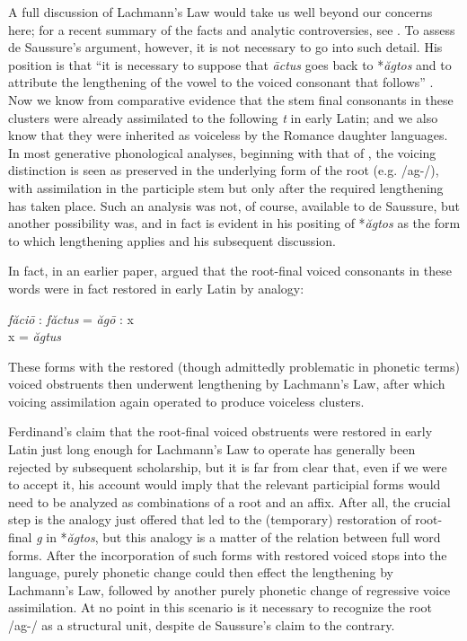 \documentclass[output=paper]{langsci/langscibook}
\begin{document}
A full discussion of Lachmann's Law would take us well beyond our
concerns here; for a recent summary of the facts and analytic
controversies, see \citet{roberts09:lachmann}. To assess de
Saussure's argument, however, it is not necessary to go into such
detail. His position is that ``it is necessary to suppose that
\emph{\=actus} goes back to *\emph{\u{a}gtos} and to attribute the
lengthening of the vowel to the voiced consonant that follows''
.  Now we know
from comparative evidence that the stem final consonants in these
clusters were already assimilated to the following \emph{t} in early
Latin; and we also know that they were inherited as voiceless by the
Romance daughter languages. In most generative phonological analyses,
beginning with that of \citet{kiparsky:thesis}, the voicing
distinction is seen as preserved in the underlying form of the root
(e.g. \mbox{/ag-/}), with assimilation in the participle stem but only
after the required lengthening has taken place. Such an analysis was
not, of course, available to de Saussure, but another possibility was,
and in fact is evident in his positing of *\emph{\u{a}gtos} as the
form to which lengthening applies and his subsequent discussion.

In fact, in an earlier paper, \citet{saussure89:lachmann} argued that
the root-final voiced consonants in these words were in fact restored
in early Latin by analogy:

\noindent\parbox{\linewidth}{\begin{center}
  \emph{f\u{a}ci\=o} : \emph{f\u{a}ctus} = \emph{\u{a}g\=o} : x\\
  x = \emph{\u{a}gtus}
\end{center}}

\noindent
These forms with the restored (though admittedly problematic in
phonetic terms) voiced obstruents then underwent lengthening by
Lachmann's Law, after which voicing assimilation again operated to
produce voiceless clusters.

Ferdinand's claim that the root-final voiced obstruents were restored
in early Latin just long enough for Lachmann's Law to operate has
generally been rejected by subsequent scholarship, but it is far from
clear that, even if we were to accept it, his account would imply that
the relevant participial forms would need to be analyzed as
combinations of a root and an affix. After all, the crucial step is
the analogy just offered that led to the (temporary) restoration of
root-final \emph{g} in *\emph{\u{a}gtos}, but this analogy is a matter
of the relation between full word forms.  After the incorporation of
such forms with restored voiced stops into the language, purely
phonetic change could then effect the lengthening by Lachmann's Law,
followed by another purely phonetic change of regressive voice
assimilation. At no point in this scenario is it necessary to
recognize the root \mbox{/ag-/} as a structural unit, despite de
Saussure's claim to the contrary.\largerpage[1.5]
\end{document}
